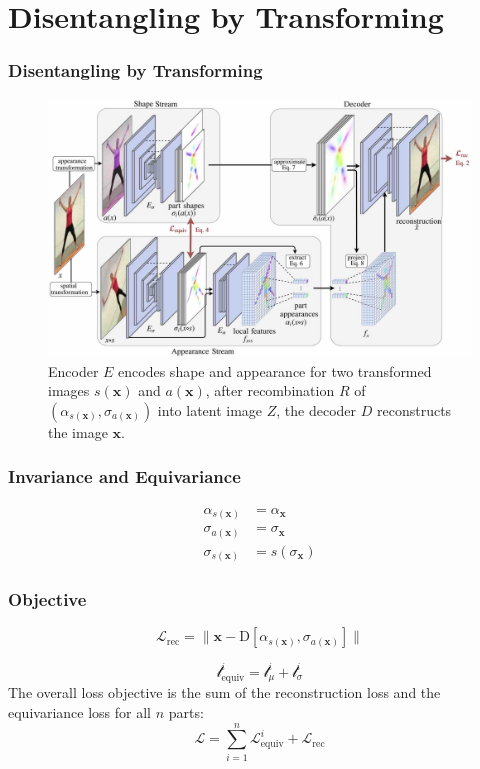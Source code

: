 \section{Disentangling by Transforming}
	\begin{frame}
	\frametitle{Disentangling by Transforming}
		\begin{figure}[t]
			\centering
			\includegraphics[trim={0cm 0cm 0cm 0cm},clip, width=1.\linewidth]{fig/other/architecture_final}
			\caption{Encoder $E$ encodes shape and appearance for two transformed images $s(\mathbf{x})$ and $a(\mathbf{x})$, after recombination $R$ of $({\alpha}_{s(\mathbf{x})}, {\sigma}_{a(\mathbf{x})})$ into latent image $Z$, the decoder $D$ reconstructs the image $\mathbf{x}$.}
			\label{fig:architecture}
		\end{figure}
	\end{frame}

	\begin{frame}
	\frametitle{Invariance and Equivariance}
		\begin{align}
			{\alpha}_{s(\mathbf{x})}  &= {\alpha}_{\mathbf{x}} \tag{invariance of appearance}\\
			{\sigma}_{a(\mathbf{x})} &= {\sigma}_{\mathbf{x}}  \tag{invariance of shape}\\
			{\sigma}_{s(\mathbf{x})} &= s({\sigma}_{\mathbf{x}}) \tag{equivariance of shape}
		\label{eq:invar}
		\end{align} %
	\end{frame}

	\begin{frame}
	\frametitle{Objective}
		\begin{equation}\label{eq:loss_rec}
			\mathcal{L}_{\textrm{rec}}= \lVert  \mathbf{x}  - \mathrm{D}[{\alpha}_{s(\mathbf{x})}, {\sigma}_{a(\mathbf{x})}]\rVert
		\end{equation}

		\begin{equation}
			\mathcal{l}_{\textrm{equiv}}^i = \mathcal{l}_{\mu}^i+ \mathcal{l}_{\sigma}^i
		\label{covariance}
		\end{equation}
		The overall loss objective is the sum of the reconstruction loss and the equivariance loss for all $n$ parts:
		\begin{equation}
		\mathcal{L} = \sum_{i=1}^n \mathcal{L}_{\text{equiv}}^i + \mathcal{L}_{\textrm{rec}}
		\end{equation}
	\end{frame}


